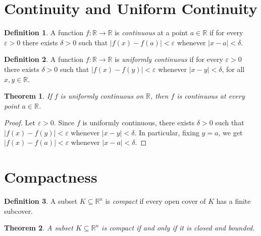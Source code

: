 \documentclass{article}
\newtheorem{theorem}{Theorem}
\theoremstyle{definition}
\newtheorem{definition}{Definition}
\theoremstyle{remark}
\begin{document}
\section{Continuity and Uniform Continuity}

\begin{definition}\label{def:continuous}
A function $f : \mathbb{R} \to \mathbb{R}$ is \emph{continuous} at a point
$a \in \mathbb{R}$ if for every $\varepsilon > 0$ there exists $\delta > 0$
such that $|f(x) - f(a)| < \varepsilon$ whenever $|x - a| < \delta$.
\end{definition}

\begin{definition}\label{def:uniform-continuous}
A function $f : \mathbb{R} \to \mathbb{R}$ is \emph{uniformly continuous}
if for every $\varepsilon > 0$ there exists $\delta > 0$ such that
$|f(x) - f(y)| < \varepsilon$ whenever $|x - y| < \delta$,
for all $x, y \in \mathbb{R}$.
\end{definition}

\begin{theorem}\label{thm:uniform-implies-continuous}
If $f$ is uniformly continuous on $\mathbb{R}$, then $f$ is continuous at
every point $a \in \mathbb{R}$.
\end{theorem}

\begin{proof}
Let $\varepsilon > 0$. Since $f$ is uniformly continuous, there exists
$\delta > 0$ such that $|f(x) - f(y)| < \varepsilon$ whenever $|x - y| < \delta$.
In particular, fixing $y = a$, we get $|f(x) - f(a)| < \varepsilon$
whenever $|x - a| < \delta$.
\end{proof}

\section{Compactness}

\begin{definition}\label{def:compact}
A subset $K \subseteq \mathbb{R}^n$ is \emph{compact} if every open cover
of $K$ has a finite subcover.
\end{definition}

\begin{theorem}\label{thm:heine-borel}
A subset $K \subseteq \mathbb{R}^n$ is compact if and only if it is
closed and bounded.
\end{theorem}
\end{document}
